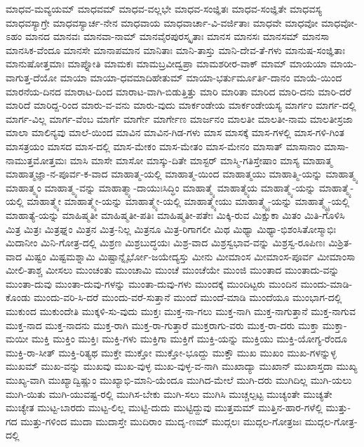 {ಮಾಧವ-ಮವ್ಯಯಮ್
ಮಾಧವಮ್
ಮಾಧವ-ವಲ್ಲಭೇ
ಮಾಧವ-ಸಂಜ್ಞಿತಃ
ಮಾಧವ-ಸಂಜ್ಞಿತೇ
ಮಾಧವಸ್ಯ
ಮಾಧವಸ್ಯಾಗ್ರೇ
ಮಾಧವಸ್ಯಾರ್ಚ-ನೇನ
ಮಾಧವಾಯ
ಮಾಧವಾರ್ಚಾ-ವಿ-ವರ್ಜಿತಾಃ
ಮಾಧವೇ
ಮಾಧವೋ
ಮಾಧವೋ-ಽಹಂ
ಮಾನದ
ಮಾನವಃ
ಮಾನವಾ-ನಾಮ್
ಮಾನವೈರಪುರಸ್ಕೃತಾಃ
ಮಾನಸ
ಮಾನಸಃ
ಮಾನಸಮ್
ಮಾನಸಾ
ಮಾನಸಿಕ-ವೆಂದೂ
ಮಾನಸೇ
ಮಾನಾಪಮಾನ
ಮಾನಿತಾಃ
ಮಾನಿ-ತಾಸ್ತು
ಮಾನಿ-ದೇವ-ತೆ-ಗಳು
ಮಾನುಷ-ಸಂಜ್ಞಿತಾಃ
ಮಾನುಷೋತ್ತಮಾಃ
ಮಾಪ್ನೋತಿ
ಮಾಮಕಃ
ಮಾಮಬ್ರವೀದ್ವಪ್ರಾ
ಮಾಮಶರೀರ-ವಾಕ್
ಮಾಮ್
ಮಾಯಯಾ
ಮಾಯ-ವಾಗುತ್ತ-ದೆಯೋ
ಮಾಯಾ
ಮಾಯಾ-ಧವಮಾದಿಹೇತುಮ್
ಮಾಯಾ-ಭರ್ತುರ್ಮೂರ್ತಿ-ದಾನಂ
ಮಾಯೆ-ಯಿಂದ
ಮಾರನೆಯ-ದಿನದ
ಮಾರಾಟ-ದಿಂದ
ಮಾರಾಟ-ವಾಗಿ-ಬಿಡುತ್ತಿತ್ತು
ಮಾರಿ
ಮಾರಿತಾ
ಮಾರಿದ
ಮಾರಿ-ದನು
ಮಾರಿ-ದರೆ
ಮಾರಿದೆ
ಮಾರಿದ್ದ-ರಿಂದ
ಮಾರು-ವ-ವನು
ಮಾರು-ವುದು
ಮಾರ್ಕಂಡೇಯ
ಮಾರ್ಕಂಡೇಯಸ್ಯ
ಮಾರ್ಗಂ
ಮಾರ್ಗ-ದಲ್ಲಿ
ಮಾರ್ಗ-ವಿಲ್ಲ
ಮಾರ್ಗ-ವೆಂಬ
ಮಾರ್ಗೆ
ಮಾರ್ಗೇ
ಮಾರ್ಗೇಣ
ಮಾರ್ಜನಂ
ಮಾಲತೀ
ಮಾಲತೀ-ನಾಮ
ಮಾಲತೀಸ್ರಜಾ
ಮಾಲಾ
ಮಾಲಿನ್ಯವು
ಮಾಲೆ-ಯಿಂದ
ಮಾವಿನ
ಮಾವಿನ-ಗಿಡ-ಗಳು
ಮಾಸ
ಮಾಸಕ್ಕೆ
ಮಾಸ-ಗಳಲ್ಲಿ
ಮಾಸ-ಗಳಿ-ಗಿಂತ
ಮಾಸತ್ರಯಂ
ಮಾಸದ
ಮಾಸ-ದಲ್ಲಿ
ಮಾಸ-ಮೇಕಂ
ಮಾಸ-ಮೇತಂ
ಮಾಸ-ಮೇನಂ
ಮಾಸಾತ್
ಮಾಸಾನಾಂ
ಮಾಸಾ-ನಾಮುತ್ತಮೋತ್ತಮಃ
ಮಾಸಿ
ಮಾಸೇ
ಮಾಸೋ
ಮಾಸ್ಕು-ದಿತೇ
ಮಾಸ್ಟರ್
ಮಾಸ್ಮಿ-ಗತಿಸ್ತೇಷಾಂ
ಮಾಸ್ಯ
ಮಾಹಾತ್ಮ
ಮಾಹಾತ್ಮಜ್ಞಾ-ನ-ಪೂರ್ವ-ಕ-ವಾದ
ಮಾಹಾತ್ಮ-ಯಲ್ಲಿ
ಮಾಹಾತ್ಮ-ಯಿಂದ
ಮಾಹಾತ್ಮಯು
ಮಾಹಾತ್ಮಿ-ಯನ್ನು
ಮಾಹಾತ್ಮ್ಯ
ಮಾಹಾತ್ಮ್ಯಂ
ಮಾಹಾತ್ಮ್ಯ-ವನ್ನು
ಮಾಹಾತ್ಮ್ಯಾ-ದಾಯುಃಸಿದ್ಧಿಂ
ಮಾಹಾತ್ಮ್ಯೆ
ಮಾಹಾತ್ಮ್ಯೆಯ
ಮಾಹಾತ್ಮ್ಯೆ-ಯನ್ನು
ಮಾಹಾತ್ಮ್ಯೆ-ಯಲ್ಲಿ
ಮಾಹಾತ್ಮ್ಯೇ
ಮಾಹಾತ್ಮ್ಯೇ-ಯನ್ನು
ಮಾಹಾತ್ಮ್ಯೇ-ಯಲ್ಲಿ
ಮಾಹಾತ್ಮ್ಯೇಯು
ಮಾಹಾತ್ಮ್ಯೈ-ಯನ್ನು
ಮಾಹಾತ್ಮ್ಯೈ-ಯಲ್ಲಿ
ಮಾಹಾತ್ಯೆ-ಯನ್ನು
ಮಾಹಿಷ್ಮತೀ
ಮಾಹಿಷ್ಮತೀ-ಪತಿಃ
ಮಾಹಿಷ್ಮತೀ-ಪತೇಃ
ಮಿಕ್ಕಿ-ರುವ
ಮಿಕ್ಷುಕಾ
ಮಿತಂ
ಮಿತಿ-ಗೊಳಿಸಿ
ಮಿತ್ರ
ಮಿತ್ರಃ
ಮಿತ್ರಘ್ನಂ
ಮಿತ್ರನ
ಮಿತ್ರ-ನಿಲ್ಲ
ಮಿತ್ರನೂ
ಮಿತ್ರ-ರಿಗಾಗಲೀ
ಮಿಥ
ಮಿಥ್ಯಾ
ಮಿಥ್ಯಾ-ಭಿಶಂಸಿತೋಸ್ಮಾಭಿಃ
ಮಿದಾನೀಂ
ಮಿನಿ-ಗೋತ್ರ-ದಲ್ಲಿ
ಮಿಶ್ರಣ
ಮಿಶ್ರಬುದ್ಧಯಃ
ಮಿಶ್ರ-ವಾದ
ಮಿಶ್ರಸ್ವಭಾವ-ವನ್ನು
ಮಿಶ್ರಸ್ವ-ರೂಪಿಣಃ
ಮಿಶ್ರಿತ-ವಾದ
ಮಿಷ್ಟಂ
ಮಿಷ್ಟಮಶ್ನಾಮಿ
ಮಿಷ್ಟಾನ್ನೈರ್ಭೋ-ಜಯೇದ್ಯಸ್ತು
ಮೀನು
ಮೀಮಾಂಸ
ಮೀಮಾಂಸ-ಪೂರ್ವ
ಮೀಮಾಂಸಾ
ಮೀಲಿ-ತಾಶ್ಚ
ಮೀಸಲು
ಮುಂಚಂತು
ಮುಂಚಾಮಿ
ಮುಂಚೆ
ಮುಂಚೆಯೇ
ಮುಂಜಿ
ಮುಂತಾದ
ಮುಂತಾದು-ವನ್ನು
ಮುಂತಾ-ದುವು
ಮುಂತಾ-ದುವು-ಗಳನ್ನು
ಮುಂತಾ-ದುವು-ಗಳು
ಮುಂದಕ್ಕೆ
ಮುಂದಿಟ್ಟರು
ಮುಂದಿನ
ಮುಂದು-ಮಾಡಿ-ಕೊಂಡು
ಮುಂದು-ವರಿ-ಸಿ-ದರೆ
ಮುಂದು-ವರೆ-ಸುತ್ತಾನೆ
ಮುಂದೆ
ಮುಂದೆ-ಮಾಡಿ
ಮುಂದೆಯೂ
ಮುಂಭಾಗ-ದಲ್ಲಿ
ಮುಕುಂದ
ಮುಕುಂದೇತಿ
ಮುಕ್ಕಳಿ-ಸು-ವುದು
ಮುಕ್ತಃ
ಮುಕ್ತ-ನಾ-ಗಲು
ಮುಕ್ತ-ನಾಗಿ
ಮುಕ್ತ-ನಾಗುತ್ತಾನೆ
ಮುಕ್ತ-ನಾಗುವ
ಮುಕ್ತ-ನಾದ
ಮುಕ್ತ-ನಾದನು
ಮುಕ್ತ-ರಾಗಿ
ಮುಕ್ತ-ರಾ-ಗುತ್ತಾರೆ
ಮುಕ್ತರಾಗು-ವರು
ಮುಕ್ತ-ರಾ-ದರು
ಮುಕ್ತಾ
ಮುಕ್ತಾ-ಮಯೀ
ಮುಕ್ತಿ
ಮುಕ್ತಿಂ
ಮುಕ್ತಿಃ
ಮುಕ್ತಿ-ಗಳು
ಮುಕ್ತಿಗಾ
ಮುಕ್ತಿಗೆ
ಮುಕ್ತಿ-ಯನ್ನು
ಮುಕ್ತಿಯು
ಮುಕ್ತಿ-ಯೋಗ್ಯ-ರೆಂದೂ
ಮುಕ್ತಿ-ರಾ-ಸೀತ್
ಮುಕ್ತಿ-ರಿತ್ಯಥ
ಮುಕ್ತೇ
ಮುಕ್ತೋ
ಮುಕ್ತೋ-ಭೂದ್ದು
ಮುಕ್ತೌ
ಮುಖ
ಮುಖಂ
ಮುಖ-ಗಳನ್ನುಳ್ಳ
ಮುಖಮ್
ಮುಖ-ವನ್ನು
ಮುಖವು
ಮುಖ-ವುಳ್ಳ
ಮುಖ-ವುಳ್ಳ-ವ-ನಾಗಿ
ಮುಖಾದ್ಯಾ
ಮುಖಾನ್
ಮುಖಾಸ್ತದಾ
ಮುಖ್ಯ
ಮುಖ್ಯ-ವಾಗಿ
ಮುಖ್ಯಾದ್ವಿಷ್ಣುಂ
ಮುಖ್ಯಾಭಿ-ಮಾನಿ-ಯೆಂದೂ
ಮುಗಿದ-ಮೇಲೆ
ಮುಗಿ-ದರು
ಮುಗಿದಿಲ್ಲ
ಮುಗಿ-ಯಲು
ಮುಗಿ-ಯಿತು
ಮುಗಿ-ಯುವಷ್ಟ-ರಲ್ಲಿ
ಮುಗಿಸ-ಬೇಕು
ಮುಗಿ-ಸಲು
ಮುಗಿಸಿ
ಮುಚ್ಚಲ್ಪಟ್ಟ
ಮುಚ್ಯಂತೇ
ಮುಚ್ಯತೇ
ಮುಚ್ಯೇತ
ಮುಟ್ಟ-ಬಾರದು
ಮುಟ್ಟ-ಲಿಲ್ಲ
ಮುಟ್ಟಿ-ದುದು
ಮುಟ್ಟಿದ್ದುವು
ಮುತ್ತಮಮ್
ಮುತ್ತಿನ-ಹಾರ-ಗಳೆಲ್ಲಿ
ಮುತ್ತು-ಗದ
ಮುತ್ತು-ಗಳಿಂದ
ಮುದಾ
ಮುದಾಸ್ತೇ
ಮುದಿರಾಂ
ಮುದೃ-ಣಮ್
ಮುದ್ಗಲಃ
ಮುದ್ಗಲ-ಗೋತ್ರಜಃ
ಮುದ್ಗಲ-ಗೋತ್ರ-ದಲ್ಲಿ
}
